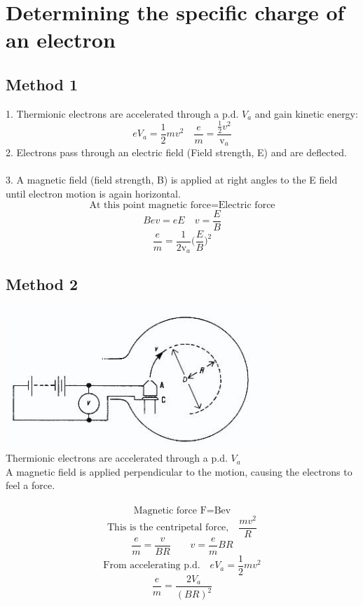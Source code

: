 \documentclass[12pt]{article}
\begin{document}
\section{Determining the specific charge of an electron}
\subsection{Method 1}
1. Thermionic electrons are accelerated through a p.d. $V_a$ and gain kinetic energy:\\
$$eV_a=\frac{1}{2}mv^2 \quad \frac{e}{m}=\frac{\frac{1}{2}v^2}{\textrm{v}_a}$$
2. Electrons pass through an electric field (Field strength, E) and are deflected.\\
\\
3. A magnetic field (field strength, B) is applied at right angles to the E field until electron motion is again horizontal.
$$\textrm{At this point magnetic force=Electric force}$$
$$Bev=eE \quad v=\frac{E}{B}$$
$$\frac{e}{m}=\frac{1}{2\textrm{v}_a}\Bigg(\frac{E}{B}\Bigg)^2$$
\subsection{Method 2}
\includegraphics[width=10cm]{circluar_path.jpg}\\
Thermionic electrons are accelerated through a p.d. $V_a$\\
A magnetic field is applied perpendicular to the motion, causing the electrons to feel a force.\\
\\
$$\textrm{Magnetic force   F=Bev}$$
$$\textrm{This is the centripetal force,} \quad \frac{mv^2}{R}$$
$$\frac{e}{m}=\frac{v}{BR} \quad \quad v=\frac{e}{m}BR$$
$$\textrm{From accelerating p.d.}\quad eV_a=\frac{1}{2}mv^2$$
$$\frac{e}{m}=\frac{2V_a}{(BR)^2}$$
\newpage
\end{document}
